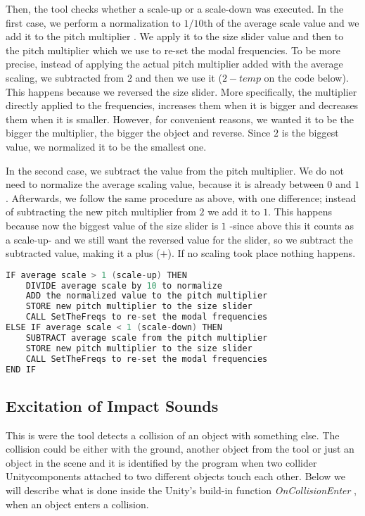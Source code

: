 Then, the tool checks whether a scale-up or a scale-down was executed. In the first case, we perform a normalization to $1/10$th of the average scale value and we add it to the pitch multiplier . We apply it to the size slider value and then to the pitch multiplier which we use to re-set the modal frequencies. To be more precise, instead of applying the actual pitch multiplier added with the average scaling, we subtracted from 2 and then we use it ($2-temp$ on the code below). This happens because we reversed the size slider. More specifically, the multiplier directly applied to the frequencies, increases them when it is bigger and decreases them when it is smaller. However, for convenient reasons, we wanted it to be the bigger the multiplier, the bigger the object and reverse. Since $2$ is the biggest value, we normalized it to be the smallest one.

In the second case, we subtract the value from the pitch multiplier. We do not need to normalize the average scaling value, because it is already between $0$ and $1$. Afterwards, we follow the same procedure as above, with one difference; instead of subtracting the new pitch multiplier from $2$ we add it to $1$. This happens because now the biggest value of the size slider is $1$ -since above this it counts as a scale-up- and we still want the reversed value for the slider, so we subtract the subtracted value, making it a plus ($+$). If no scaling took place nothing happens.

\begin{lstlisting}[language=C]
IF average scale > 1 (scale-up) THEN
    DIVIDE average scale by 10 to normalize
    ADD the normalized value to the pitch multiplier
    STORE new pitch multiplier to the size slider
    CALL SetTheFreqs to re-set the modal frequencies
ELSE IF average scale < 1 (scale-down) THEN
    SUBTRACT average scale from the pitch multiplier
    STORE new pitch multiplier to the size slider
    CALL SetTheFreqs to re-set the modal frequencies
END IF
\end{lstlisting}



\subsection{Excitation of Impact Sounds}
This is were the tool detects a collision of an object with something else. The collision could be either with the ground, another object from the tool or just an object in the scene and it is identified by the program when two collider Unity\textregistered components attached to two different objects touch each other. Below we will describe what is done inside the Unity's build-in function \textit{OnCollisionEnter} \cite{bib:unity_doc}, when an object enters a collision.

